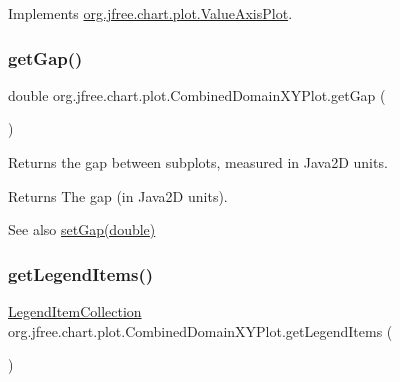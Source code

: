 Implements \mbox{\hyperlink{interfaceorg_1_1jfree_1_1chart_1_1plot_1_1_value_axis_plot_a54815b2f078c11b2618804fe3e7e5353}{org.\+jfree.\+chart.\+plot.\+Value\+Axis\+Plot}}.

\mbox{\label{classorg_1_1jfree_1_1chart_1_1plot_1_1_combined_domain_x_y_plot_a382bed0c0682b03a2418721cd26f4243}} 
\subsubsection{\texorpdfstring{get\+Gap()}{getGap()}}
{\footnotesize\ttfamily double org.\+jfree.\+chart.\+plot.\+Combined\+Domain\+X\+Y\+Plot.\+get\+Gap (\begin{DoxyParamCaption}{ }\end{DoxyParamCaption})}

Returns the gap between subplots, measured in Java2D units.

\begin{DoxyReturn}{Returns}
The gap (in Java2D units).
\end{DoxyReturn}
\begin{DoxySeeAlso}{See also}
\mbox{\hyperlink{classorg_1_1jfree_1_1chart_1_1plot_1_1_combined_domain_x_y_plot_a17aa2de4bb33adb4d8f379fc11105f93}{set\+Gap(double)}} 
\end{DoxySeeAlso}
\mbox{\label{classorg_1_1jfree_1_1chart_1_1plot_1_1_combined_domain_x_y_plot_a97116ae980d7a928848db0ce0c0bcbe7}} 
\subsubsection{\texorpdfstring{get\+Legend\+Items()}{getLegendItems()}}
{\footnotesize\ttfamily \mbox{\hyperlink{classorg_1_1jfree_1_1chart_1_1_legend_item_collection}{Legend\+Item\+Collection}} org.\+jfree.\+chart.\+plot.\+Combined\+Domain\+X\+Y\+Plot.\+get\+Legend\+Items (\begin{DoxyParamCaption}{ }\end{DoxyParamCaption})}

